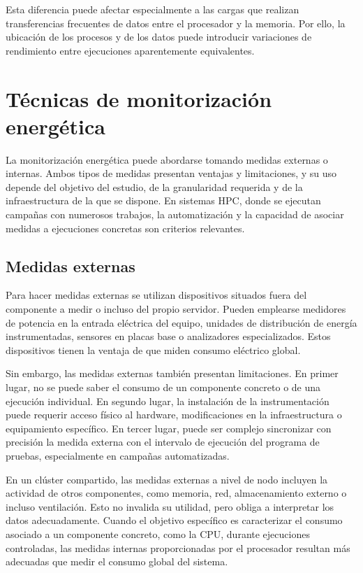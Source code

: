Esta diferencia puede afectar especialmente a las cargas que realizan transferencias frecuentes de datos entre el procesador y la memoria. Por ello, la ubicación de los procesos y de los datos puede introducir variaciones de rendimiento entre ejecuciones aparentemente equivalentes.



\section{Técnicas de monitorización energética}

La monitorización energética puede abordarse tomando medidas externas o internas. Ambos tipos de medidas presentan ventajas y limitaciones, y su uso depende del objetivo del estudio, de la granularidad requerida y de la infraestructura de la que se dispone. En sistemas HPC, donde se ejecutan campañas con numerosos trabajos, la automatización y la capacidad de asociar medidas a ejecuciones concretas son criterios relevantes.

\subsection{Medidas externas}

Para hacer medidas externas se utilizan dispositivos situados fuera del componente a medir o incluso del propio servidor. Pueden emplearse medidores de potencia en la entrada eléctrica del equipo, unidades de distribución de energía instrumentadas, sensores en placas base o analizadores especializados. Estos dispositivos tienen la ventaja de que miden consumo eléctrico global.

Sin embargo, las medidas externas también presentan limitaciones. En primer lugar, no se puede saber el consumo de un componente concreto o de una ejecución individual. En segundo lugar, la instalación de la instrumentación puede requerir acceso físico al hardware, modificaciones en la infraestructura o equipamiento específico. En tercer lugar, puede ser complejo sincronizar con precisión la medida externa con el intervalo de ejecución del programa de pruebas, especialmente en campañas automatizadas.

En un clúster compartido, las medidas externas a nivel de nodo incluyen la actividad de otros componentes, como memoria, red, almacenamiento externo o incluso ventilación. Esto no invalida su utilidad, pero obliga a interpretar los datos adecuadamente. Cuando el objetivo específico es caracterizar el consumo asociado a un componente concreto, como la CPU, durante ejecuciones controladas, las medidas internas proporcionadas por el procesador resultan más adecuadas que medir el consumo global del sistema.

